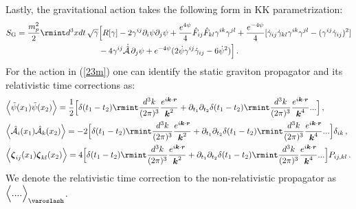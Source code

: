 Lastly, the gravitational action takes the following form in KK parametrization:
\begin{align}
    \begin{split}
        S_{\text{G}}=\frac{m_{p}^2}{2}\rmint d^3x dt \,\sqrt{\gamma}&\Big[R[\gamma]-2\gamma^{ij}\partial_{i}\psi\partial_{j}\psi+\frac{e^{4\psi}}{4}\Hat{F}_{ij}\Hat{F}_{kl}\gamma^{ik}\gamma^{jl}+\frac{e^{-4\psi}}{4}[\Dot{\gamma}_{ij}\Dot{\gamma}_{kl}\gamma^{ik}\gamma^{jl}-(\gamma^{ij}\Dot{\gamma}_{ij})^2]\\ &
-4\gamma^{ij}\Dot{\Hat{\mathcal{A}}}\,\partial_{j}\psi
        +e^{-4\psi}(2\Dot{\psi}\gamma^{ij}\Dot{\gamma}_{ij}-6\Dot{\psi}^2)\Big]\,.\label{23m}
    \end{split}
\end{align}
For the action in (\ref{23m}) one can identify the static graviton propagator and its relativistic time corrections as:
\begin{align}
  \begin{split}
&\Big\langle\tilde{\psi}(x_1)\tilde{\psi}(x_2)\Big\rangle=\frac{1}{2}\Big[\delta(t_1-t_2)\rmint \frac{d^3k}{(2\pi)^3}\frac{e^{i\boldsymbol{k}\cdot\boldsymbol{r}}}{\boldsymbol{k}^2}+\partial_{t_1}\partial_{t_2}\delta(t_1-t_2)\rmint \frac{d^3k}{(2\pi)^3}\frac{e^{i\boldsymbol{k}\cdot\boldsymbol{r}}}{\boldsymbol{k}^4}...\Big]\,,\\ &
        \Big\langle\Hat{\mathcal{A}}_{i}(x_1)\Hat{\mathcal{A}}_k(x_2)\Big\rangle=-2\Big[\delta(t_1-t_2)\rmint \frac{d^3k}{(2\pi)^3}\frac{e^{i\boldsymbol{k}\cdot\boldsymbol{r}}}{\boldsymbol{k}^2}+\partial_{t_1}\partial_{t_2}\delta(t_1-t_2)\rmint \frac{d^3k}{(2\pi)^3}\frac{e^{i\boldsymbol{k}\cdot\boldsymbol{r}}}{\boldsymbol{k}^4}...\Big]\delta_{ik}\,,\\ &
        \Big\langle\boldsymbol{\zeta}_{ij}(x_1)\boldsymbol{\zeta}_{kl}(x_2)\Big\rangle=4\Big[\delta(t_1-t_2)\rmint \frac{d^3k}{(2\pi)^3}\frac{e^{i\boldsymbol{k}\cdot\boldsymbol{r}}}{\boldsymbol{k}^2}+\partial_{t_1}\partial_{t_2}\delta(t_1-t_2)\rmint \frac{d^3k}{(2\pi)^3}\frac{e^{i\boldsymbol{k}\cdot\boldsymbol{r}}}{\boldsymbol{k}^4}...\Big]P_{ij,kl} \,.
    \end{split}
\end{align}
We denote the relativistic time correction to the non-relativistic propagator as $\Big\langle....\Big\rangle_{\varoslash}$.

